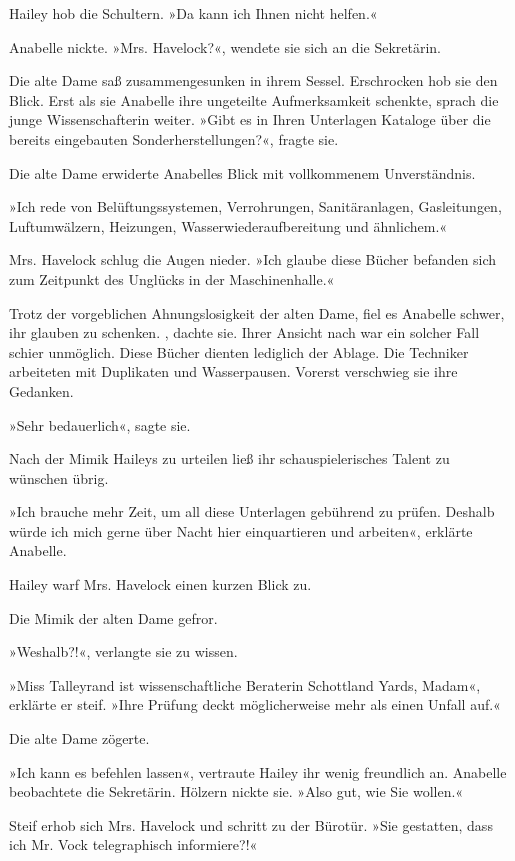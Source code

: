 Hailey hob die Schultern. »Da kann ich Ihnen nicht helfen.«

Anabelle nickte. »Mrs. Havelock?«, wendete sie sich an die
Sekretärin.

Die alte Dame saß zusammengesunken in ihrem Sessel. Erschrocken hob
sie den Blick. Erst als sie Anabelle ihre ungeteilte Aufmerksamkeit
schenkte, sprach die junge Wissenschafterin weiter. »Gibt es in
Ihren Unterlagen Kataloge über die bereits eingebauten
Sonderherstellungen?«, fragte sie.

Die alte Dame erwiderte Anabelles Blick mit vollkommenem
Unverständnis.

»Ich rede von Belüftungssystemen, Verrohrungen, Sanitäranlagen,
Gasleitungen, Luftumwälzern, Heizungen, Wasserwiederaufbereitung
und ähnlichem.«

Mrs. Havelock schlug die Augen nieder. »Ich glaube diese Bücher
befanden sich zum Zeitpunkt des Unglücks in der Maschinenhalle.«

Trotz der vorgeblichen Ahnungslosigkeit der alten Dame, fiel es
Anabelle schwer, ihr glauben zu schenken. , dachte
sie. Ihrer Ansicht nach war ein solcher Fall schier unmöglich.
Diese Bücher dienten lediglich der Ablage. Die Techniker arbeiteten
mit Duplikaten und Wasserpausen. Vorerst verschwieg sie ihre
Gedanken.

»Sehr bedauerlich«, sagte sie.

Nach der Mimik Haileys zu urteilen ließ ihr schauspielerisches
Talent zu wünschen übrig.

»Ich brauche mehr Zeit, um all diese Unterlagen gebührend zu
prüfen. Deshalb würde ich mich gerne über Nacht hier einquartieren
und arbeiten«, erklärte Anabelle.

Hailey warf Mrs. Havelock einen kurzen Blick zu.

Die Mimik der alten Dame gefror.

»Weshalb?!«, verlangte sie zu wissen.

»Miss Talleyrand ist wissenschaftliche Beraterin Schottland Yards,
Madam«, erklärte er steif. »Ihre Prüfung deckt möglicherweise mehr
als einen Unfall auf.«

Die alte Dame zögerte.

»Ich kann es befehlen lassen«, vertraute Hailey ihr wenig
freundlich an. Anabelle beobachtete die Sekretärin. Hölzern nickte
sie. »Also gut, wie Sie wollen.«

Steif erhob sich Mrs. Havelock und schritt zu der Bürotür. »Sie
gestatten, dass ich Mr. Vock telegraphisch informiere?!«

